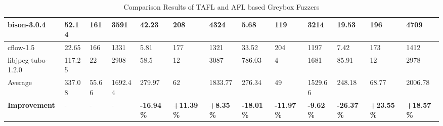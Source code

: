 \begin{table}[t]
\begin{adjustbox}{max width=\textwidth}
\begin{tabular}{|l|l|l|l|l|l|l|l|l|l|l|l|l|}
bison-3.0.4      &   52.14            &    161 &   3591  &    42.23        &  208       &   4324    &    5.68     &  119       &  3214       &     19.53          &    196           &        4709                        \\ \hline
cflow-1.5          &   22.65           &    166  &   1331   &    5.81        &      177    &    1321    &     33.52   &    204   &   1197        &     7.42            &    173           &        1412                         \\ \hline
libjpeg-tubo-1.2.0   &   117.25   &    22    &   2908    &   58.5       &      12    &    3087    &   786.03   &    4      &    1681       &     85.91          &    12             &        2978                       \\ \hline
Average  &    337.08           &     55.66      &    1692.44       &      279.97             &    62         &   1833.77            &      276.34       &    49      &    1529.66           &     248.18        &      68.77          &         2006.78 \\ \hline
\textbf{Improvement}  &    -                     &     -               &    -                   &    \textbf{ -16.94\% }           &\textbf{+11.39\%  }         &  \textbf{ +8.35\% }         &    \textbf{  -18.01\%}       &    \textbf{-11.97\%}        &    \textbf{-9.62\%}            &  \textbf{-26.37\%}      &   \textbf{+23.55\% }    &  \textbf{+18.57\% }             \\ \hline
\end{tabular}
\end{adjustbox}
\caption{Comparison Results of TAFL and AFL based Greybox Fuzzers}
\label{Integration}
\end{table}

